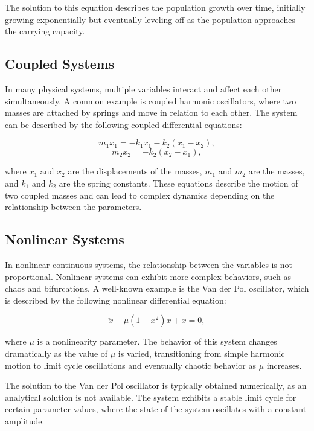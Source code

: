 \documentclass{amsbook}
\begin{document}
The solution to this equation describes the population growth over time, initially growing exponentially but eventually leveling off as the population approaches the carrying capacity.

\subsection{Coupled Systems}

In many physical systems, multiple variables interact and affect each other simultaneously. A common example is coupled harmonic oscillators, where two masses are attached by springs and move in relation to each other. The system can be described by the following coupled differential equations:

\begin{equation}
    m_1 \ddot{x_1} = -k_1 x_1 - k_2 (x_1 - x_2),
\end{equation}
\begin{equation}
    m_2 \ddot{x_2} = -k_2 (x_2 - x_1),
\end{equation}

where \(x_1\) and \(x_2\) are the displacements of the masses, \(m_1\) and \(m_2\) are the masses, and \(k_1\) and \(k_2\) are the spring constants. These equations describe the motion of two coupled masses and can lead to complex dynamics depending on the relationship between the parameters.

\subsection{Nonlinear Systems}

In nonlinear continuous systems, the relationship between the variables is not proportional. Nonlinear systems can exhibit more complex behaviors, such as chaos and bifurcations. A well-known example is the Van der Pol oscillator, which is described by the following nonlinear differential equation:

\begin{equation}
    \ddot{x} - \mu (1 - x^2) \dot{x} + x = 0,
\end{equation}

where \(\mu\) is a nonlinearity parameter. The behavior of this system changes dramatically as the value of \(\mu\) is varied, transitioning from simple harmonic motion to limit cycle oscillations and eventually chaotic behavior as \(\mu\) increases.

The solution to the Van der Pol oscillator is typically obtained numerically, as an analytical solution is not available. The system exhibits a stable limit cycle for certain parameter values, where the state of the system oscillates with a constant amplitude.
\end{document}
